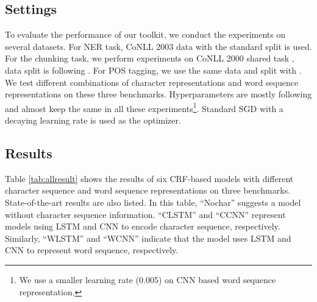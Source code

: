 \documentclass[11pt,a4paper]{article}
\begin{document}
\subsection{Settings}
To evaluate the performance of our toolkit, we conduct the experiments on several datasets. For NER task, CoNLL 2003 data \cite{tjong2003introduction} with the standard split is used. For the chunking task, we perform experiments on CoNLL 2000 shared task \cite{tjong2000introduction}, data split is following . For POS tagging, we use the same data and split with . We test different combinations of character representations and word sequence representations on these three benchmarks. Hyperparameters are mostly following  and almost keep the same in all these experiments\footnote{We use a smaller learning rate (0.005) on CNN based word sequence representation.}. Standard SGD with a decaying learning rate is used as the optimizer.


\begin{table}[!tp]
\begin{center}
\end{center}
\caption{Results using different features.}
\label{tab:feature}
\end{table}

\subsection{Results}
Table \ref{tab:allresult} shows the results of six CRF-based models with different character sequence and word sequence representations on three benchmarks. State-of-the-art results are also listed. In this table, ``Nochar'' suggests a model without character sequence information. ``CLSTM'' and ``CCNN'' represent models using LSTM and CNN to encode character sequence, respectively. Similarly, ``WLSTM'' and ``WCNN'' indicate that the model uses LSTM and CNN to represent word sequence, respectively.
\end{document}
